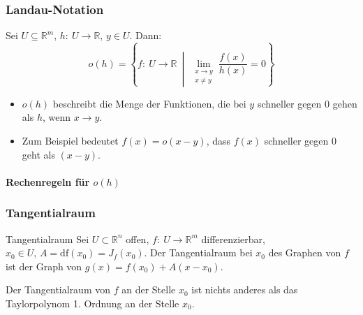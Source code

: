 \documentclass[a4paper,10pt]{article}
\def\R{\mathbb{R}}
\begin{document}
\subsubsection{Landau-Notation}
\begin{subbox}{}
    Sei \( U \subseteq \R^m, \, h: \: U \to \R, \, y \in U \). Dann:
    \[
        o(h) = \left\{ f: \: U \to \R \: \middle| \: \lim_{\substack{x \to y \\ x \neq y}} \frac{f(x)}{h(x)} = 0 \right\}
    \]
\end{subbox}
\begin{itemize}
    \item \( o(h) \) beschreibt die Menge der Funktionen, die bei \( y \) schneller gegen \( 0 \) gehen als \( h \), wenn \( x \to y \).
    \item Zum Beispiel bedeutet \( f(x) = o(x - y) \), dass \( f(x) \) schneller gegen \( 0 \) geht als \( (x - y) \).
\end{itemize}

\paragraph{Rechenregeln für \texorpdfstring{\( o(h) \)}{o(h)}}


\subsubsection{Tangentialraum}

\begin{mainbox}{Tangentialraum}
    Sei \( U \subset \R^n \) offen, \( f: \: U \to \R^m \) differenzierbar, \( x_0 \in U, \, A = \mathrm{df}(x_0) = J_f(x_0) \). Der Tangentialraum bei \( x_0 \) des Graphen von \( f \) ist der Graph von \( g(x) = f(x_0) + A(x - x_0) \).
\end{mainbox}

Der Tangentialraum von \( f \) an der Stelle \( x_0 \) ist nichts anderes als das Taylorpolynom 1. Ordnung an der Stelle \( x_0 \).
\end{document}
